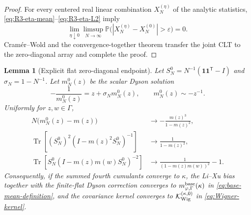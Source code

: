 \documentclass[11pt]{article}
\newtheorem{lemma}[theorem]{Lemma}
\theoremstyle{definition}
\theoremstyle{remark}
\newcommand{\Tr}{\operatorname{Tr}}
\newcommand{\one}{\mathbf 1}
\begin{document}
\begin{proof}
For every centered real linear combination \(X_N^{(\eta)}\) of the analytic
statistics, \eqref{eq:R3-eta-mean}--\eqref{eq:R3-eta-L2} imply
\[
 \lim_{\eta\downarrow0}\limsup_{N\to\infty}
 \mathbb P\bigl(|X_N^{(\eta)}-X_N^{(0)}|>\varepsilon\bigr)=0.
\]
Cram\'er--Wold and the convergence-together theorem transfer the joint CLT
to the zero-diagonal array and complete the proof.
\end{proof}

\begin{lemma}[Explicit flat zero-diagonal endpoint]
\label{lem:R3-flat-endpoint}
Let
\(
 S_N^0=N^{-1}(\one\one^{\mathsf T}-I)
\)
and \(\sigma_N=1-N^{-1}\).  Let \(m_N^0(z)\) be the scalar Dyson solution
\begin{equation}\label{eq:R3-flat-endpoint-QVE}
 -\frac{1}{m_N^0(z)}=z+\sigma_Nm_N^0(z),
 \qquad m_N^0(z)\sim-z^{-1}.
\end{equation}
Uniformly for \(z,w\in\Gamma\),
\begin{align}
 N\bigl(m_N^0(z)-m(z)\bigr)
 &\longrightarrow-\frac{m(z)^3}{1-m(z)^2},
 \label{eq:R3-flat-Dyson-limit}\\
 \Tr\!\left[(S_N^0)^2(I-m(z)^2S_N^0)^{-1}\right]
 &\longrightarrow\frac{1}{1-m(z)^2},
 \label{eq:R3-flat-bias-trace}\\
 \Tr\!\left[S_N^0(I-m(z)m(w)S_N^0)^{-2}\right]
 &\longrightarrow
 \frac{1}{(1-m(z)m(w))^2}-1.
 \label{eq:R3-flat-cov-trace}
\end{align}
Consequently, if the summed fourth cumulants converge to \(\kappa\), the
Li--Xu bias together with the finite-flat Dyson correction converges to
\(m_{\varphi,\Gamma}^{\rm base}(\kappa)\) in
\eqref{eq:base-mean-definition}, and the covariance kernel converges to
\(\mathcal K_{\rm Wig}^{(\kappa,0)}\) in
\eqref{eq:Wigner-kernel}.
\end{lemma}
\end{document}
